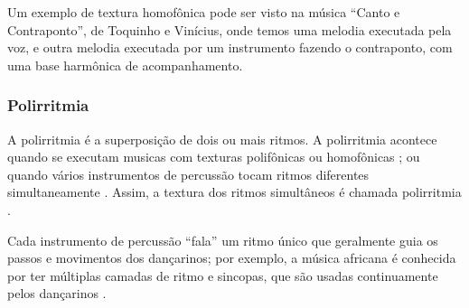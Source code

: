 \begin{example}
Um exemplo de textura homofônica pode ser visto na música ``Canto e Contraponto'',
de Toquinho e Vinícius, 
onde temos uma melodia executada pela voz, e outra melodia executada por um instrumento fazendo o contraponto, 
com uma base harmônica de acompanhamento.
\end{example}




\subsubsection{Polirritmia}
\label{subsec:polirritmia}
A polirritmia é a superposição de dois ou mais ritmos.
A polirritmia acontece quando se executam musicas com texturas polifônicas ou homofônicas
\cite[pp. 93]{alves2004teoria};
ou quando vários instrumentos de percussão tocam ritmos diferentes simultaneamente \cite[pp. 35]{holland2013music}.
Assim, a textura dos ritmos simultâneos é chamada polirritmia \cite[pp. 35]{holland2013music}.

Cada instrumento de percussão ``fala'' um ritmo único que geralmente guia os passos e movimentos dos dançarinos;
por exemplo, a música africana é conhecida por ter múltiplas camadas de ritmo e sincopas,
 que são usadas continuamente pelos dançarinos \cite[pp. 35]{holland2013music}.


